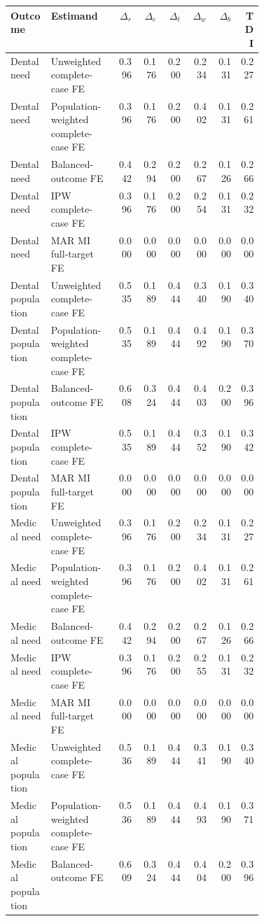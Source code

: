 \begin{tabular}{p{0.16\linewidth}p{0.26\linewidth}rrrrrr}
\toprule
Outcome & Estimand & $\Delta_r$ & $\Delta_c$ & $\Delta_t$ & $\Delta_w$ & $\Delta_b$ & TDI \\
\midrule
Dental need & Unweighted complete-case FE & 0.396 & 0.176 & 0.200 & 0.234 & 0.131 & 0.227 \\
Dental need & Population-weighted complete-case FE & 0.396 & 0.176 & 0.200 & 0.402 & 0.131 & 0.261 \\
Dental need & Balanced-outcome FE & 0.442 & 0.294 & 0.200 & 0.267 & 0.126 & 0.266 \\
Dental need & IPW complete-case FE & 0.396 & 0.176 & 0.200 & 0.254 & 0.131 & 0.232 \\
Dental need & MAR MI full-target FE & 0.000 & 0.000 & 0.000 & 0.000 & 0.000 & 0.000 \\
Dental population & Unweighted complete-case FE & 0.535 & 0.189 & 0.444 & 0.340 & 0.190 & 0.340 \\
Dental population & Population-weighted complete-case FE & 0.535 & 0.189 & 0.444 & 0.492 & 0.190 & 0.370 \\
Dental population & Balanced-outcome FE & 0.608 & 0.324 & 0.444 & 0.403 & 0.200 & 0.396 \\
Dental population & IPW complete-case FE & 0.535 & 0.189 & 0.444 & 0.352 & 0.190 & 0.342 \\
Dental population & MAR MI full-target FE & 0.000 & 0.000 & 0.000 & 0.000 & 0.000 & 0.000 \\
Medical need & Unweighted complete-case FE & 0.396 & 0.176 & 0.200 & 0.234 & 0.131 & 0.227 \\
Medical need & Population-weighted complete-case FE & 0.396 & 0.176 & 0.200 & 0.402 & 0.131 & 0.261 \\
Medical need & Balanced-outcome FE & 0.442 & 0.294 & 0.200 & 0.267 & 0.126 & 0.266 \\
Medical need & IPW complete-case FE & 0.396 & 0.176 & 0.200 & 0.255 & 0.131 & 0.232 \\
Medical need & MAR MI full-target FE & 0.000 & 0.000 & 0.000 & 0.000 & 0.000 & 0.000 \\
Medical population & Unweighted complete-case FE & 0.536 & 0.189 & 0.444 & 0.341 & 0.190 & 0.340 \\
Medical population & Population-weighted complete-case FE & 0.536 & 0.189 & 0.444 & 0.493 & 0.190 & 0.371 \\
Medical population & Balanced-outcome FE & 0.609 & 0.324 & 0.444 & 0.404 & 0.200 & 0.396 \\

\end{tabular}
